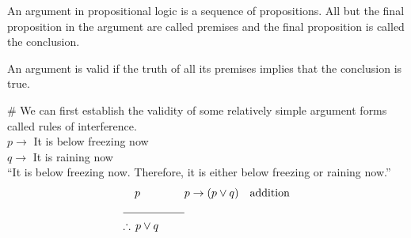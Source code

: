 \documentclass[../main-sheet.tex]{subfiles}
\begin{document}
\begin{defn}
    An argument in propositional logic is a sequence of propositions. All but the final proposition in the argument are called premises and the final proposition is called the conclusion.

    An argument is valid if the truth of all its premises implies that the conclusion is true.
\end{defn}
\# We can first establish the validity of some relatively simple argument forms called rules of interference.\\
\(p\to\) It is below freezing now\\
\(q\to\) It is raining now\\
``It is below freezing now. Therefore, it is either below freezing or raining now.''
\begin{align*}
    p \qquad\qquad                   & p\to(p\vee q)\quad \text{addition} \\
    \cline{1-1}
    \therefore\, p \vee q \qquad\,\, &
\end{align*}
\end{document}
